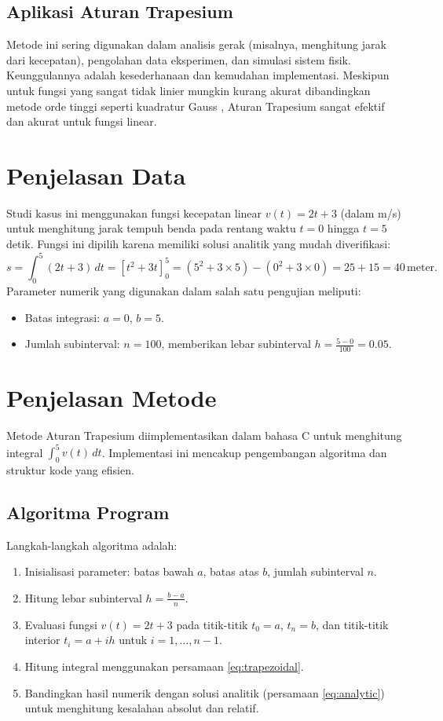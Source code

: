 \documentclass[conference]{IEEEtran}
\begin{document}
\subsection{Aplikasi Aturan Trapesium}
Metode ini sering digunakan dalam analisis gerak (misalnya, menghitung jarak dari kecepatan), pengolahan data eksperimen, dan simulasi sistem fisik. Keunggulannya adalah kesederhanaan dan kemudahan implementasi. Meskipun untuk fungsi yang sangat tidak linier mungkin kurang akurat dibandingkan metode orde tinggi seperti kuadratur Gauss \cite{b1}, Aturan Trapesium sangat efektif dan akurat untuk fungsi linear.

\section{Penjelasan Data}
Studi kasus ini menggunakan fungsi kecepatan linear \( v(t) = 2t + 3 \) (dalam m/s) untuk menghitung jarak tempuh benda pada rentang waktu \( t = 0 \) hingga \( t = 5 \) detik. Fungsi ini dipilih karena memiliki solusi analitik yang mudah diverifikasi:
\begin{equation}
s = \int_0^5 (2t + 3) \, dt = \left[ t^2 + 3t \right]_0^5 = (5^2 + 3 \times 5) - (0^2 + 3 \times 0) = 25 + 15 = 40 \, \text{meter}.
\label{eq:analytic}
\end{equation}
Parameter numerik yang digunakan dalam salah satu pengujian meliputi:
\begin{itemize}
    \item Batas integrasi: \( a = 0 \), \( b = 5 \).
    \item Jumlah subinterval: \( n = 100 \), memberikan lebar subinterval \( h = \frac{5-0}{100} = 0.05 \).
\end{itemize}

\section{Penjelasan Metode}
Metode Aturan Trapesium diimplementasikan dalam bahasa C untuk menghitung integral \( \int_0^5 v(t) \, dt \). Implementasi ini mencakup pengembangan algoritma dan struktur kode yang efisien.

\subsection{Algoritma Program}
Langkah-langkah algoritma adalah:
\begin{enumerate}
    \item Inisialisasi parameter: batas bawah \( a \), batas atas \( b \), jumlah subinterval \( n \).
    \item Hitung lebar subinterval \( h = \frac{b-a}{n} \).
    \item Evaluasi fungsi \( v(t) = 2t + 3 \) pada titik-titik \( t_0 = a \), \( t_n = b \), dan titik-titik interior \( t_i = a + i h \) untuk \( i = 1, \ldots, n-1 \).
    \item Hitung integral menggunakan persamaan \eqref{eq:trapezoidal}.
    \item Bandingkan hasil numerik dengan solusi analitik (persamaan \eqref{eq:analytic}) untuk menghitung kesalahan absolut dan relatif.
\end{enumerate}
\end{document}
